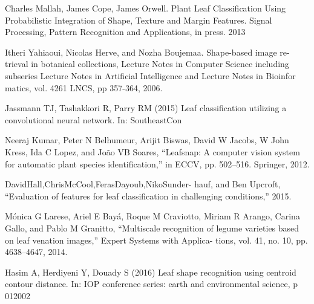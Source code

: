 \documentclass[journal]{IEEEtran}
\begin{document}

%
%
%
\begin{thebibliography}{1}


  Charles Mallah, James Cope, James Orwell. Plant Leaf Classification Using Probabilistic Integration of Shape, Texture and Margin Features. Signal Processing, Pattern Recognition and Applications, in press. 2013

  Itheri Yahiaoui, Nicolas Herve, and Nozha Boujemaa. Shape-based image re-trieval in botanical collections, Lecture Notes in Computer Science including subseries Lecture Notes in Artificial Intelligence and Lecture Notes in Bioinfor matics, vol. 4261 LNCS, pp 357-364, 2006.

  Jassmann TJ, Tashakkori R, Parry RM (2015) Leaf classification utilizing a convolutional neural network. In: SoutheastCon

  Neeraj Kumar, Peter N Belhumeur, Arijit Biswas, David W Jacobs, W John Kress, Ida C Lopez, and João VB Soares, “Leafsnap: A computer vision system for automatic plant species identification,” in ECCV, pp. 502–516. Springer, 2012.

  DavidHall,ChrisMcCool,FerasDayoub,NikoSunder- hauf, and Ben Upcroft, “Evaluation of features for leaf classification in challenging conditions,” 2015.

  Mónica G Larese, Ariel E Bayá, Roque M Craviotto, Miriam R Arango, Carina Gallo, and Pablo M Granitto, “Multiscale recognition of legume varieties based on leaf venation images,” Expert Systems with Applica- tions, vol. 41, no. 10, pp. 4638–4647, 2014.

  Hasim A, Herdiyeni Y, Douady S (2016) Leaf shape recognition using centroid contour distance. In: IOP conference series: earth and environmental science, p 012002


\end{thebibliography}
\end{document}

